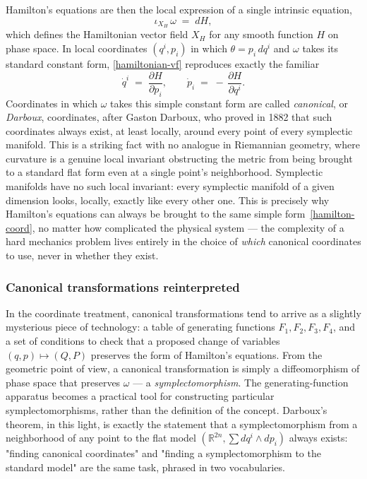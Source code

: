 Hamilton's equations are then the local expression of a single
intrinsic equation,
\begin{equation}
  \iota_{X_H}\,\omega \;=\; dH,
  \label{hamiltonian-vf}
\end{equation}
which defines the Hamiltonian vector field $X_H$ for any smooth
function $H$ on phase space. In local coordinates $(q^i,p_i)$ in
which $\theta = p_i\,dq^i$ and $\omega$ takes its standard constant
form, \eqref{hamiltonian-vf} reproduces exactly the familiar
\begin{equation}
  \dot q^i \;=\; \frac{\partial H}{\partial p_i},
  \qquad
  \dot p_i \;=\; -\,\frac{\partial H}{\partial q^i}.
  \label{hamilton-coord}
\end{equation}
Coordinates in which $\omega$ takes this simple constant form are
called \emph{canonical}, or \emph{Darboux}, coordinates, after Gaston
Darboux, who proved in 1882 that such coordinates always exist, at
least locally, around every point of every symplectic
manifold. This is a striking fact with no analogue
in Riemannian geometry, where curvature is a genuine local invariant
obstructing the metric from being brought to a standard flat form
even at a single point's neighborhood. Symplectic manifolds have no
such local invariant: every symplectic manifold of a given dimension
looks, locally, exactly like every other one. This is precisely why
Hamilton's equations can always be brought to the same simple
form~\eqref{hamilton-coord}, no matter how complicated the
physical system --- the complexity of a hard mechanics problem lives
entirely in the choice of \emph{which} canonical coordinates to use,
never in whether they exist.

\subsubsection{Canonical transformations reinterpreted}

In the coordinate treatment, canonical transformations tend to arrive
as a slightly mysterious piece of technology: a table of generating
functions $F_1,F_2,F_3,F_4$, and a set of conditions to check that a
proposed change of variables $(q,p)\mapsto(Q,P)$ preserves the form
of Hamilton's equations. From the geometric point of view, a
canonical transformation is simply a diffeomorphism of phase space
that preserves $\omega$ --- a \emph{symplectomorphism}. The
generating-function apparatus becomes a practical tool for
constructing particular symplectomorphisms, rather than the
definition of the concept. Darboux's theorem, in this light, is
exactly the statement that a symplectomorphism from a neighborhood
of any point to the flat model $(\mathbb R^{2n}, \sum dq^i\wedge
dp_i)$ always exists: "finding canonical coordinates" and "finding a
symplectomorphism to the standard model" are the same task, phrased
in two vocabularies.

